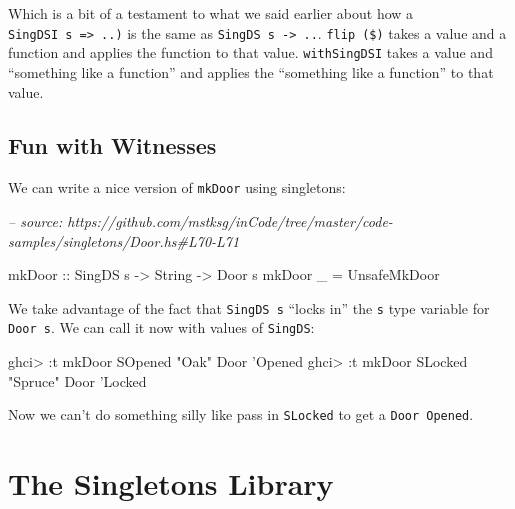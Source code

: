 \documentclass[]{article}
\newenvironment{Shaded}{}{}
\newcommand{\CommentTok}[1]{\textcolor[rgb]{0.38,0.63,0.69}{\textit{#1}}}
\newcommand{\DataTypeTok}[1]{\textcolor[rgb]{0.56,0.13,0.00}{#1}}
\newcommand{\FunctionTok}[1]{\textcolor[rgb]{0.02,0.16,0.49}{#1}}
\newcommand{\NormalTok}[1]{#1}
\newcommand{\OtherTok}[1]{\textcolor[rgb]{0.00,0.44,0.13}{#1}}
\newcommand{\StringTok}[1]{\textcolor[rgb]{0.25,0.44,0.63}{#1}}
\begin{document}
Which is a bit of a testament to what we said earlier about how a
\texttt{SingDSI\ s\ =\textgreater{}\ ..)} is the same as
\texttt{SingDS\ s\ -\textgreater{}\ ..}. \texttt{flip\ (\$)} takes a value and a
function and applies the function to that value. \texttt{withSingDSI} takes a
value and ``something like a function'' and applies the ``something like a
function'' to that value.

\hypertarget{fun-with-witnesses}{%
\subsection{Fun with Witnesses}\label{fun-with-witnesses}}

We can write a nice version of \texttt{mkDoor} using singletons:

\begin{Shaded}
\begin{Highlighting}[]
\CommentTok{-- source: https://github.com/mstksg/inCode/tree/master/code-samples/singletons/Door.hs#L70-L71}

\OtherTok{mkDoor ::} \DataTypeTok{SingDS}\NormalTok{ s }\OtherTok{->} \DataTypeTok{String} \OtherTok{->} \DataTypeTok{Door}\NormalTok{ s}
\NormalTok{mkDoor _ }\FunctionTok{=} \DataTypeTok{UnsafeMkDoor}
\end{Highlighting}
\end{Shaded}

We take advantage of the fact that \texttt{SingDS\ s} ``locks in'' the
\texttt{s} type variable for \texttt{Door\ s}. We can call it now with values of
\texttt{SingDS}:

\begin{Shaded}
\begin{Highlighting}[]
\NormalTok{ghci}\FunctionTok{>} \FunctionTok{:}\NormalTok{t mkDoor }\DataTypeTok{SOpened} \StringTok{"Oak"}
\DataTypeTok{Door}\NormalTok{ '}\DataTypeTok{Opened}
\NormalTok{ghci}\FunctionTok{>} \FunctionTok{:}\NormalTok{t mkDoor }\DataTypeTok{SLocked} \StringTok{"Spruce"}
\DataTypeTok{Door}\NormalTok{ '}\DataTypeTok{Locked}
\end{Highlighting}
\end{Shaded}

Now we can't do something silly like pass in \texttt{SLocked} to get a
\texttt{Door\ \textquotesingle{}Opened}.

\hypertarget{the-singletons-library}{%
\section{The Singletons Library}\label{the-singletons-library}}
\end{document}

